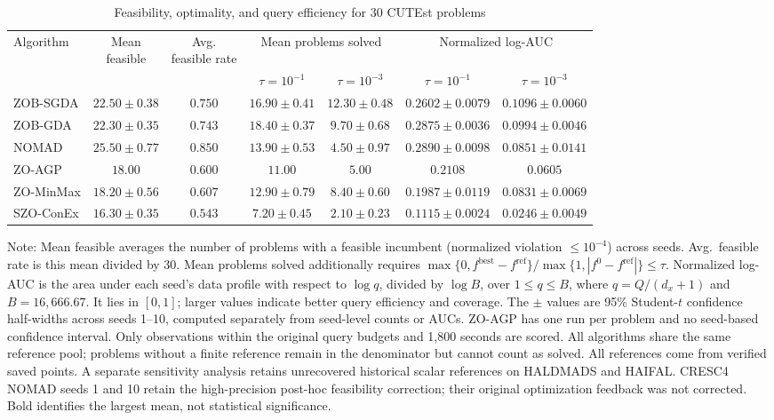 \begin{table}[htbp]
\centering
\caption{Feasibility, optimality, and query efficiency for 30 CUTEst problems}
\label{tab:cutest_combined}
\small
\setlength{\tabcolsep}{3pt}
\begin{tabular}{lcccccc}
\toprule
Algorithm & \shortstack{Mean\\feasible} & \shortstack{Avg.\\feasible rate}
& \multicolumn{2}{c}{Mean problems solved} & \multicolumn{2}{c}{Normalized log-AUC} \\
\cmidrule(lr){4-5}\cmidrule(lr){6-7}
& & & $\tau=10^{-1}$ & $\tau=10^{-3}$ & $\tau=10^{-1}$ & $\tau=10^{-3}$ \\
\midrule
ZOB-SGDA & $22.50 \pm 0.38$ & $0.750$ & $16.90 \pm 0.41$ & $\mathbf{12.30} \pm 0.48$ & $0.2602 \pm 0.0079$ & $\mathbf{0.1096} \pm 0.0060$ \\
ZOB-GDA & $22.30 \pm 0.35$ & $0.743$ & $\mathbf{18.40} \pm 0.37$ & $9.70 \pm 0.68$ & $0.2875 \pm 0.0036$ & $0.0994 \pm 0.0046$ \\
\midrule
NOMAD & $\mathbf{25.50} \pm 0.77$ & $\mathbf{0.850}$ & $13.90 \pm 0.53$ & $4.50 \pm 0.97$ & $\mathbf{0.2890} \pm 0.0098$ & $0.0851 \pm 0.0141$ \\
ZO-AGP & $18.00$ & $0.600$ & $11.00$ & $5.00$ & $0.2108$ & $0.0605$ \\
ZO-MinMax & $18.20 \pm 0.56$ & $0.607$ & $12.90 \pm 0.79$ & $8.40 \pm 0.60$ & $0.1987 \pm 0.0119$ & $0.0831 \pm 0.0069$ \\
SZO-ConEx & $16.30 \pm 0.35$ & $0.543$ & $7.20 \pm 0.45$ & $2.10 \pm 0.23$ & $0.1115 \pm 0.0024$ & $0.0246 \pm 0.0049$ \\
\bottomrule
\end{tabular}
\vspace{0.5em}
\parbox{0.98\textwidth}{\footnotesize
Note: Mean feasible averages the number of problems with a feasible incumbent
(normalized violation $\le10^{-4}$) across seeds. Avg.\ feasible rate is this mean
divided by 30. Mean problems solved additionally requires
$\max\{0,f^{\mathrm{best}}-f^{\mathrm{ref}}\}/\max\{1,|f^0-f^{\mathrm{ref}}|\}\le\tau$.
Normalized log-AUC is the area under each seed's data profile with respect to
$\log q$, divided by $\log B$, over $1\le q\le B$, where
$q=Q/(d_x+1)$ and $B=16,666.67$.
It lies in $[0,1]$; larger values indicate better query efficiency and coverage.
The $\pm$ values are 95\% Student-$t$ confidence half-widths across seeds 1--10,
computed separately from seed-level counts or AUCs.
ZO-AGP has one run per problem and no seed-based confidence interval.
Only observations within the original query budgets and 1,800 seconds are scored.
All algorithms share the same reference pool; problems without a finite reference
remain in the denominator but cannot count as solved.
All references come from verified saved points. A separate sensitivity analysis retains unrecovered historical scalar references on HALDMADS and HAIFAL.
CRESC4 NOMAD seeds 1 and 10 retain the high-precision post-hoc feasibility correction;
their original optimization feedback was not corrected.
Bold identifies the largest mean, not statistical significance.
}
\end{table}
